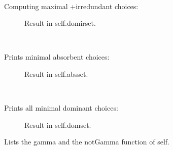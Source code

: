 \documentclass[letterpaper,10pt,english]{sphinxmanual}
\begin{document}
\begin{fulllineitems}
\begin{fulllineitems}
\end{fulllineitems}


\begin{fulllineitems}
\label{techDoc:digraphs.Digraph.showMaxDomIrred}~\begin{description}
\item[{Computing maximal +irredundant choices:}] \leavevmode
Result in self.domirset.

\end{description}

\end{fulllineitems}


\begin{fulllineitems}
\label{techDoc:digraphs.Digraph.showMinAbs}~\begin{description}
\item[{Prints minimal absorbent choices:}] \leavevmode
Result in self.absset.

\end{description}

\end{fulllineitems}


\begin{fulllineitems}
\label{techDoc:digraphs.Digraph.showMinDom}~\begin{description}
\item[{Prints all minimal dominant choices:}] \leavevmode
Result in self.domset.

\end{description}

\end{fulllineitems}


\begin{fulllineitems}
\label{techDoc:digraphs.Digraph.showNeighborhoods}
Lists the gamma and the notGamma function of self.

\end{fulllineitems}


\end{fulllineitems}
\end{document}
